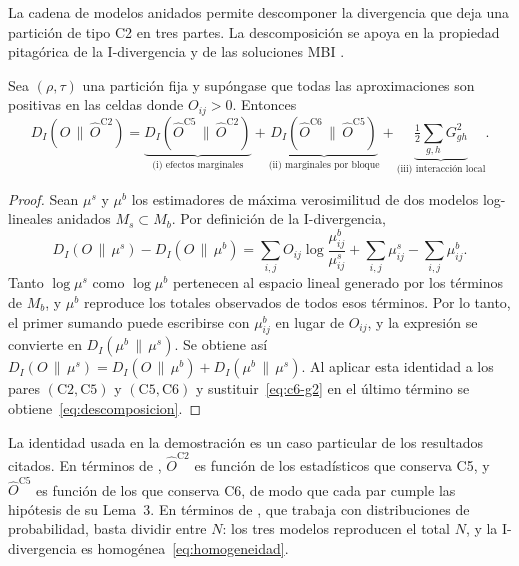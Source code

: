 La cadena de modelos anidados permite descomponer la divergencia que deja una
partición de tipo C2 en tres partes. La descomposición se apoya en la propiedad
pitagórica de la I-divergencia \cite{Csiszar1975} y de las soluciones MBI
\cite[Lema~3]{Banerjee2007}.

\begin{proposicion}\label{prop:descomposicion}
Sea $(\rho,\tau)$ una partición fija y supóngase que todas las aproximaciones son
positivas en las celdas donde $O_{ij} > 0$. Entonces
\begin{equation}\label{eq:descomposicion}
  D_I\!\left(O \,\|\, \hat{O}^{\mathrm{C2}}\right)
  = \underbrace{D_I\!\left(\hat{O}^{\mathrm{C5}} \,\|\, \hat{O}^{\mathrm{C2}}\right)}_{\text{(i) efectos marginales}}
  + \underbrace{D_I\!\left(\hat{O}^{\mathrm{C6}} \,\|\, \hat{O}^{\mathrm{C5}}\right)}_{\text{(ii) marginales por bloque}}
  + \underbrace{\tfrac{1}{2} \textstyle\sum_{g,h} G^2_{gh}}_{\text{(iii) interacción local}} .
\end{equation}
\end{proposicion}

\begin{proof}
Sean $\mu^s$ y $\mu^b$ los estimadores de máxima
verosimilitud de dos modelos log-lineales anidados $M_s \subset M_b$. Por
definición de la I-divergencia,
\[
  D_I(O \,\|\, \mu^s) - D_I(O \,\|\, \mu^b)
  = \sum_{i,j} O_{ij} \log \frac{\mu^b_{ij}}{\mu^s_{ij}}
  + \sum_{i,j} \mu^s_{ij} - \sum_{i,j} \mu^b_{ij}.
\]
Tanto $\log \mu^s$ como $\log \mu^b$ pertenecen al espacio lineal generado por los
términos de $M_b$, y $\mu^b$ reproduce los totales observados de todos esos
términos. Por lo tanto, el primer sumando puede escribirse con $\mu^b_{ij}$ en
lugar de $O_{ij}$, y la expresión se convierte en $D_I(\mu^b \,\|\, \mu^s)$. Se
obtiene así
$D_I(O \,\|\, \mu^s) = D_I(O \,\|\, \mu^b) + D_I(\mu^b \,\|\, \mu^s)$. Al aplicar
esta identidad a los pares $(\mathrm{C2}, \mathrm{C5})$ y
$(\mathrm{C5}, \mathrm{C6})$ y sustituir~\eqref{eq:c6-g2} en el último término se
obtiene~\eqref{eq:descomposicion}.
\end{proof}

La identidad usada en la demostración es un caso particular de los resultados
citados. En términos de \cite{Banerjee2007}, $\hat{O}^{\mathrm{C2}}$ es función de
los estadísticos que conserva C5, y $\hat{O}^{\mathrm{C5}}$ es función de los que
conserva C6, de modo que cada par cumple las hipótesis de su Lema~3. En términos
de \cite{Csiszar1975}, que trabaja con distribuciones de probabilidad, basta
dividir entre $N$: los tres modelos reproducen el total $N$, y la I-divergencia es
homogénea~\eqref{eq:homogeneidad}.

